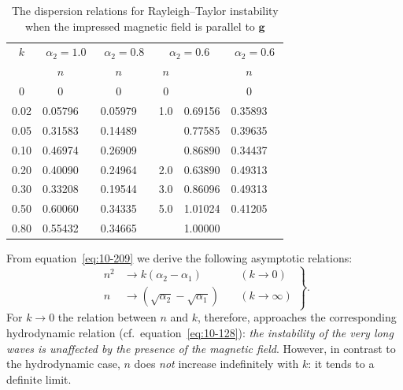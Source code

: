 \begin{table}[ht]
\centering
\caption{The dispersion relations for Rayleigh--Taylor instability when the impressed magnetic field is parallel to $\mathbf{g}$}
\label{tab:L}
\small
\begin{tabular}{c|cc|cc|cc|cc}
\hline
$k$ & \multicolumn{2}{c|}{$\alpha_2 = 1.0$} & \multicolumn{2}{c|}{$\alpha_2 = 0.8$} & \multicolumn{2}{c|}{$\alpha_2 = 0.6$} & \multicolumn{2}{c}{$\alpha_2 = 0.6$} \\
& $n$ & & $n$ & & $n$ & & $n$ & \\
\hline
0 & 0 & & 0 & & 0 & & 0 & \\
0.02 & 0.05796 & & 0.05979 & & 1.0 & 0.69156 & 0.35893 & \\
0.05 & 0.31583 & & 0.14489 & & & 0.77585 & 0.39635 & \\
0.10 & 0.46974 & & 0.26909 & & & 0.86890 & 0.34437 & \\
0.20 & 0.40090 & & 0.24964 & & 2.0 & 0.63890 & 0.49313 & \\
0.30 & 0.33208 & & 0.19544 & & 3.0 & 0.86096 & 0.49313 & \\
0.50 & 0.60060 & & 0.34335 & & 5.0 & 1.01024 & 0.41205 & \\
0.80 & 0.55432 & & 0.34665 & & & 1.00000 & & \\
\hline
\end{tabular}
\end{table}


From equation~\eqref{eq:10-209} we derive the following asymptotic relations:
\begin{equation}
\label{eq:10-210}
\left.
\begin{aligned}
n^2 &\to k(\alpha_2-\alpha_1) \quad &(k \to 0)\\
n &\to (\sqrt{\alpha_2}-\sqrt{\alpha_1}) \quad &(k \to \infty)
\end{aligned}
\right\}\!.
\end{equation}
For $k \to 0$ the relation between $n$ and $k$, therefore, approaches the corresponding hydrodynamic relation (cf.\ equation~\eqref{eq:10-128}): \emph{the instability of the very long waves is unaffected by the presence of the magnetic field}. However, in contrast to the hydrodynamic case, $n$ does \emph{not} increase indefinitely with $k$: it tends to a definite limit.

